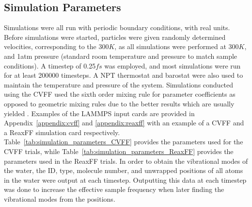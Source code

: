 		\subsection{Simulation Parameters}
			Simulations were all run with periodic boundary conditions, with real units. Before simulations were started, particles were given randomly determined velocities, corresponding to the 300$K$, as all simulations were performed at 300$K$, and 1atm pressure (standard room temperature and pressure to match sample conditions). A timestep of 0.25$fs$ was employed, and most simulations were run for at least 200000 timesteps. A NPT thermostat and barostat were also used to maintain the temperature and pressure of the system. Simulations conducted using the CVFF used the sixth order mixing rule for parameter coefficients as opposed to geometric mixing rules due to the better results which are usually yielded \cite{waldman:1993cdd}. Examples of the LAMMPS input cards are provided in Appendix~\ref{appendix:cvff} and \ref{appendix:reaxff} with an example of a CVFF and a ReaxFF simulation card respectively. Table~\ref{tab:simulation_parameters_CVFF} provides the parameters used for the CVFF trials, while Table~\ref{tab:simulation_parameters_ReaxFF} provides the parameters used in the ReaxFF trials. In order to obtain the vibrational modes of the water, the ID, type, molecule number, and unwrapped positions of all atoms in the water were output at each timestep. Outputting this data at each timestep was done to increase the effective sample frequency when later finding the vibrational modes from the positions.
			
